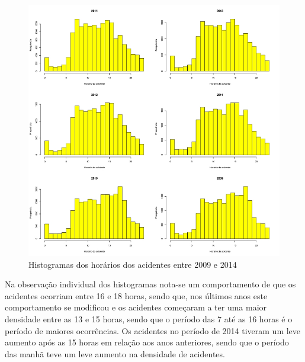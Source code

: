 \documentclass[11pt,article,oneside,a4paper]{abntex2}
\begin{document}
\begin{figure}[h!]
	\caption{Histogramas dos horários dos acidentes entre 2009 e 2014} \label{fig:histhora}
    \includegraphics[width=\textwidth]{horas_acidentes.jpg}
\end{figure}

Na observação individual dos histogramas nota-se um comportamento de que os acidentes ocorriam entre 16 e 18 horas, sendo que, nos últimos anos este comportamento se modificou e os acidentes começaram a ter uma maior densidade entre as 13 e 15 horas, sendo que o período das 7 até as 16 horas é o período de maiores ocorrências. Os acidentes no período de 2014 tiveram um leve aumento após as 15 horas em relação aos anos anteriores, sendo que o período das manhã teve um leve aumento na densidade de acidentes.
\end{document}
